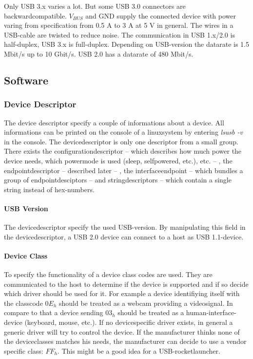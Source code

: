 \documentclass{acm_proc_article-sp}
\begin{document}
Only USB 3.x varies a lot. But some USB 3.0 connectors are backwardcompatible.
$V_{BUS}$ and GND supply the connected device with power varing from specification from 0.5 A to 3 A at 5 V in general. The wires in a USB-cable are twisted to reduce noise. The communication in USB 1.x/2.0 is half-duplex, USB 3.x is full-duplex.
Depending on USB-version the datarate is 1.5 Mbit/s up to 10 Gbit/s. USB 2.0 has a datarate of 480 Mbit/s. \cite{wiki} \cite{wiki2} \cite{usborg} \cite{beyond}

\subsection{Software} %
\subsubsection{Device Descriptor} %
The device descriptor specify a couple of informations about a device.
All informations can be printed on the console of a linuxsystem by entering \emph{lsusb -v} in the console. The devicedescriptor is only one descriptor from a small group. There exists the configurationdescriptor -- which describes how much power the device needs, which powermode is used (sleep, selfpowered, etc.), etc. -- , the endpointdescriptor -- described later -- , the interfaceendpoint -- which bundles a group of endpointdesciptors -- and stringdescriptors -- which contain a single string instead of hex-numbers. \cite{beyond}
\paragraph{USB Version}
The devicedescriptor specify the used USB-version. By manipulating this field in the devicedescriptor, a USB 2.0 device can connect to a host as USB 1.1-device. \cite{beyond}
\paragraph{Device Class}
To specify the functionality of a device class codes are used. They are communicated to the host to determine if the device is supported and if so decide which driver should be used for it. For example a device identifiying itself with the classcode $0E_h$ should be treated as a webcam providing a videosignal. In compare to that a device sending $03_h$ should be treated as a human-interface-device (keyboard, mouse, etc.).
If no devicespecific driver exists, in general a generic driver will try to control the device. If the manufacturer thinks none of the deviceclasses matches his needs, the manufacturer can decide to use a vendor specific class: $FF_h$. This might be a good idea for a USB-rocketlauncher. \cite{beyond} \cite{usborg}
\end{document}
